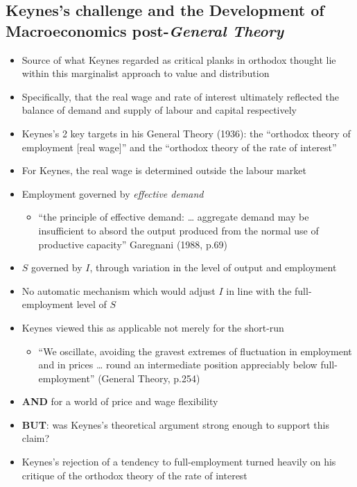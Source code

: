 \documentclass{article}
\begin{document}
\subsection{Keynes's challenge and the Development of Macroeconomics post-\textit{General Theory}}
		\begin{itemize}
			\item  Source of what Keynes regarded as critical planks in orthodox thought lie within this marginalist approach to value and distribution  
			\item Specifically, that the real wage and rate of interest ultimately reflected the balance of demand and supply of labour and capital respectively
			\item Keynes's 2 key targets in his General Theory (1936): the ``orthodox theory of employment [real wage]'' and the ``orthodox theory of the rate of interest'' 
			\item For Keynes, the real wage is determined outside the labour market
			\item Employment governed by \textit{effective demand }
			\begin{itemize}
				\item ``the principle of effective demand: \dots\: aggregate demand may be insufficient to absord the output produced from the normal use of productive capacity'' Garegnani (1988, p.69)
			\end{itemize}
			\item \( S \) governed by \( I \), through variation in the level of output and employment
			\item No automatic mechanism which would adjust \( I \) in line with the full-employment level of \( S \)
			\item Keynes viewed this as applicable not merely for the short-run
			\begin{itemize}
				\item ``We oscillate, avoiding the gravest extremes of fluctuation in employment and in prices … round an intermediate position appreciably below full-employment'' (General Theory, p.254)
			\end{itemize}
			\item \textbf{AND} for a world of price and wage flexibility 
			\item \textbf{BUT}: was Keynes's theoretical argument strong enough to support this claim?
			\item Keynes's rejection of a tendency to full-employment turned heavily on his critique of the orthodox theory of the rate of interest

\end{itemize}
\end{document}
